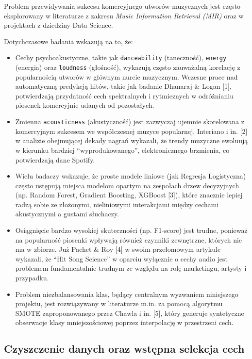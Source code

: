 \documentclass[
]{article}
\begin{document}
Problem przewidywania sukcesu komercyjnego utworów muzycznych jest
często eksplorowany w literaturze z zakresu \emph{Music Information
Retrieval (MIR)} oraz w projektach z dziedziny Data Science.

Dotychczasowe badania wskazują na to, że:

\begin{itemize}
\item
  Cechy psychoakustyczne, takie jak \texttt{danceability} (taneczność),
  \texttt{energy} (energia) oraz \texttt{loudness} (głośność), wykazują
  często zauważalną korelację z popularnością utworów w głównym nurcie
  muzycznym. Wczesne prace nad automatyczną predykcją hitów, takie jak
  badanie Dhanaraj \& Logan {[}1{]}, potwierdzają przydatność cech
  spektralnych i rytmicznych w odróżnianiu piosenek komercyjnie udanych
  od pozostałych.
\item
  Zmienna \texttt{acousticness} (akustyczność) jest zazwyczaj ujemnie
  skorelowana z komercyjnym sukcesem we współczesnej muzyce popularnej.
  Interiano i in. {[}2{]} w analizie obejmującej dekady nagrań wykazali,
  że trendy muzyczne ewoluują w kierunku bardziej ``wyprodukowanego'',
  elektronicznego brzmienia, co potwierdzają dane Spotify.
\item
  Wielu badaczy wskazuje, że proste modele liniowe (jak Regresja
  Logistyczna) często ustępują miejsca modelom opartym na zespołach
  drzew decyzyjnych (np. Random Forest, Gradient Boosting, XGBoost
  {[}3{]}), które znacznie lepiej radzą sobie ze złożonymi, nieliniowymi
  interakcjami między cechami akustycznymi a gustami słuchaczy.
\item
  Osiągnięcie bardzo wysokiej skuteczności (np. F1-score) jest trudne,
  ponieważ na popularność piosenki wpływają również czynniki zewnętrzne,
  których nie ma w zbiorze. Już Pachet \& Roy {[}4{]} w swoim
  przełomowym artykule wykazali, że ``Hit Song Science'' w oparciu
  wyłącznie o cechy audio jest problemem fundamentalnie trudnym ze
  względu na rolę marketingu, artysty i przypadku.
\item
  Problem niezbalansowania klas, będący centralnym wyzwaniem niniejszego
  projektu, jest rozwiązywany w literaturze m.in. za pomocą algorytmu
  SMOTE zaproponowanego przez Chawla i in. {[}5{]}, który generuje
  syntetyczne obserwacje klasy mniejszościowej poprzez interpolację w
  przestrzeni cech.
\end{itemize}

\subsection{Czyszczenie danych oraz wstępna selekcja
cech}\label{czyszczenie-danych-oraz-wstux119pna-selekcja-cech}
\end{document}
